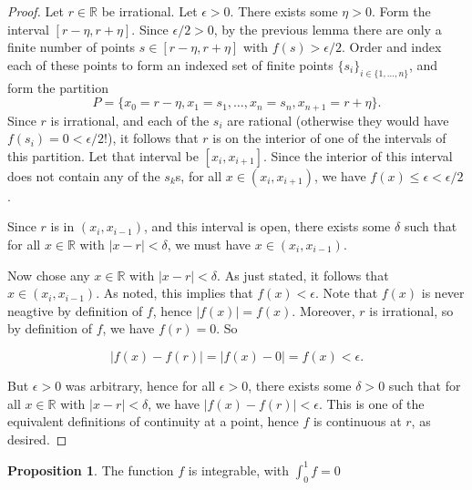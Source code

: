 \documentclass[12pt]{article}
\newcommand{\R}{\mathbb{R}}
\theoremstyle{definition}
\newtheorem{proposition}{Proposition}
\begin{document}
\begin{proof}
    Let $r\in \R$ be irrational. Let $\epsilon >0$. There exists some $\eta > 0$. Form the interval $[r - \eta, r + \eta]$. Since $\epsilon/2 > 0$, by the previous lemma there are only a finite number of points $s\in [ r - \eta, r + \eta]$ with $f(s) > \epsilon/2$. Order and index each of these points to form an indexed set of finite points $\{s_i\}_{i\in \{1,\dots, n\}}$, and form the partition 
    \[
        P = \{x_0 = r - \eta, x_1 = s_1, \dots, x_n = s_n, x_{n+1} = r + \eta\}.
        \]
    Since $r$ is irrational, and each of the $s_i$ are rational (otherwise they would have $f(s_i) = 0 < \epsilon/2$!), it follows that $r$ is on the interior of one of the intervals of this partition. Let that interval be $ [x_i, x_{i+1}] $. Since the interior of this interval does not contain any of the $s_k$s, for all $x\in (x_i, x_{i +1})$, we have $f(x) \le  \epsilon < \epsilon/2$.
    
    Since $r$ is in $(x_i, x_{i - 1})$, and this interval is open, there exists some $\delta$ such that for all $ x \in \R$ with $|x - r| < \delta$, we must have $ x\in (x_i, x_{i - 1}) $.

    Now chose any $x\in \R$ with $ |x - r| < \delta $. As just stated, it follows that $ x\in (x_i, x_{i - 1}) $. As noted, this implies that $ f(x) < \epsilon $. Note that $ f(x) $ is never neagtive by definition of $f$, hence $ |f(x)| = f(x) $. Moreover, $ r $ is irrational, so by definition of $f$, we have $ f(r) = 0 $. So 

    \[
        |f(x) - f(r)| = |f(x) - 0| = f(x) < \epsilon.
        \]

    But $\epsilon > 0$ was arbitrary, hence for all $\epsilon > 0$, there exists some $\delta > 0$ such that for all $ x\in \R $ with $ |x - r| < \delta $, we have $ |f(x) - f(r)| < \epsilon$. This is one of the equivalent definitions of continuity at a point, hence $f$ is continuous at $r$, as desired.
    
\end{proof}


\begin{proposition}
    The function $f$ is integrable, with $\int_0^1 f = 0$
\end{proposition}
\end{document}
